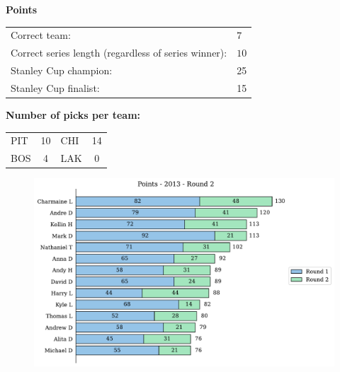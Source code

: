 \documentclass[10pt]{article}
\begin{document}
{\bf Points}\\
\begin{minipage}{12cm}
    \begin{tabular}{l l}
        Correct team:	& $7$\\
        Correct series length (regardless of series winner):	& $10$\\
        Stanley Cup champion:	& 25\\
        Stanley Cup finalist:	& 15\\
    \end{tabular}

    \vspace{1cm}
    {\bf Number of picks per team:}\\
    \begin{tabular}{lc | lc }
        PIT & 10 & CHI & 14 \\
        BOS & 4 & LAK & 0 \\
    \end{tabular}
\end{minipage}
\begin{minipage}[t]{13cm}
    \begin{figure}[H]
        \vspace{-2.5cm}
        \includegraphics[width=13cm]{../../figures/2013/Points-2013-Round2.pdf}
    \end{figure}
\end{minipage}
\end{document}
